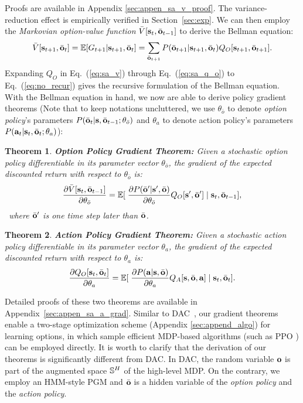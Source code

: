 \documentclass{article}
\newtheorem{thm}{Theorem}[section]
\begin{document}
Proofs are available in Appendix \ref{sec:appen_sa_v_proof}. The
variance-reduction effect is empirically verified in
Section~\ref{sec:exp}. We can then employ the \emph{Markovian
  option-value function} $\bar{V}[{\mathbf{s}}_t,\bar{{\mathbf{o}}}_{t-1}]$ to
derive the Bellman equation:
\begin{equation}
  \label{eq:sa_v}
  \bar{V}[{\mathbf{s}}_{t+1},\bar{{\mathbf{o}}}_{t}]=\mathbb{E}[G_{t+1}|{\mathbf{s}}_{t+1},\bar{{\mathbf{o}}}_{t}]= \sum_{\bar{{\mathbf{o}}}_{t+1}}P(\bar{{\mathbf{o}}}_{t+1}|{\mathbf{s}}_{t+1},\bar{{\mathbf{o}}}_{t})Q_O[ {\mathbf{s}}_{t+1},\bar{{\mathbf{o}}}_{t+1}].
\end{equation}
Expanding $Q_O$ in Eq.~(\ref{eq:sa_v}) through Eq.~(\ref{eq:sa_q_o})
to Eq.~(\ref{eq:no_recur}) gives the recursive formulation of the
Bellman equation. With the Bellman equation in hand, we now are
able to derive policy gradient theorems (Note that to keep notations uncluttered, we use $\theta_{\bar{o}}$ to denote \emph{option policy}'s parameters
$P(\bar{{\mathbf{o}}}_{t}|{\mathbf{s}},\bar{{\mathbf{o}}}_{t-1};\theta_{\bar{o}})$ and $\theta_a$ to denote action policy's parameters
$P({\mathbf{a}}_t|{\mathbf{s}}_t,\bar{{\mathbf{o}}}_t;\theta_a)$):

\begin{thm}
  \textbf{ Option Policy Gradient Theorem: } Given a stochastic
  \emph{option policy} differentiable in its parameter vector
  $\theta_{\bar{o}}$, the gradient of the expected discounted
  return with respect to $\theta_{\bar{o}}$ is:
  \begin{equation}
    \label{eq:sa_o_grad}
    \frac{\partial \bar{V}[{\mathbf{s}}_t,\bar{{\mathbf{o}}}_{t-1}]}{\partial \theta_{\bar{o}}}=\mathbb{E}[\;\frac{\partial P(\bar{{\mathbf{o}}}'|{\mathbf{s}}',\bar{{\mathbf{o}}})}{\partial \theta_{\bar{o}}}Q_O[{\mathbf{s}}',\bar{{\mathbf{o}}}']\;|\;{\mathbf{s}}_t,\bar{{\mathbf{o}}}_{t-1}],
  \end{equation}
  ~where $\bar{{\mathbf{o}}}'$ is one time step later than $\bar{{\mathbf{o}}}$.
\end{thm}
\begin{thm}
  \textbf{ Action Policy Gradient Theorem: } Given a stochastic action policy
  differentiable in its parameter vector $\theta_a$, the gradient
  of the expected discounted return with respect to $\theta_a$ is:
  \begin{equation}
    \label{eq:sa_a_grad}
      \frac{\partial Q_O[{\mathbf{s}}_t,\bar{{\mathbf{o}}}_t]}{ \partial \theta_a }=\mathbb{E}[\;\frac{\partial P({\mathbf{a}}|{\mathbf{s}},\bar{{\mathbf{o}}})}{\partial \theta_a}Q_A[ {\mathbf{s}},\bar{{\mathbf{o}}},{\mathbf{a}}]\; | \; {\mathbf{s}}_t,\bar{{\mathbf{o}}}_t].
  \end{equation}
\end{thm}
\vspace{-3mm} Detailed proofs of these two theorems are available
in Appendix~\ref{sec:appen_sa_a_grad}. Similar to
DAC~\cite{zhang2019dac}, our gradient theorems enable a two-stage
optimization scheme (Appendix \ref{sec:append_algo}) for learning
options, in which sample efficient MDP-based algorithms (such as
PPO \cite{witoonchart2017application}) can be employed directly.
It is worth to clarify that the derivation of our theorems is
significantly different from DAC. In DAC, the random variable
${\mathbf{o}}$ is part of the augmented space ${\mathbb{S}}^H$ of the high-level
MDP. On the contrary, we employ an HMM-style PGM and $\bar{{\mathbf{o}}}$
is a hidden variable of the \emph{option policy} and the
\emph{action policy}.
\end{document}

